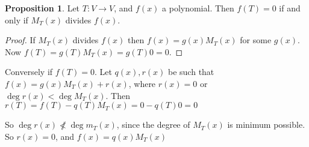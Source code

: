 \documentclass{article}
\theoremstyle{definition} \newtheorem*{definition}{Definition}
\newtheorem{proposition}[theorem]{Proposition}
\begin{document}
\begin{proposition}
  Let $T:V \rightarrow V$, and $f(x)$ a polynomial. Then $f(T)=0$ if and
  only if $M_T(x)$ divides $f(x)$.
\end{proposition}

\begin{proof}
  If $M_T(x)$ divides $f(x)$ then $f(x) =g(x)M_T(x)$ for some $g(x)$.
  Now $f(T)=g(T)M_T(x)=g(T)0=0$.
\end{proof}

Conversely if $f(T)=0$. Let $q(x),r(x)$ be such that 
$f(x)=g(x)M_T(x)+r(x)$, where $r(x)=0$ or $\deg r(x) < \deg M_T(x)$.
Then $r(T)=f(T)-q(T)M_T(x)=0 - q(T)0 = 0$

So $\deg r(x) \not \nless \deg m_T(x)$, since the degree of $M_T(x)$ is
minimum possible. So $r(x)=0$, and $f(x)=q(x)M_T(x)$
\end{document}
